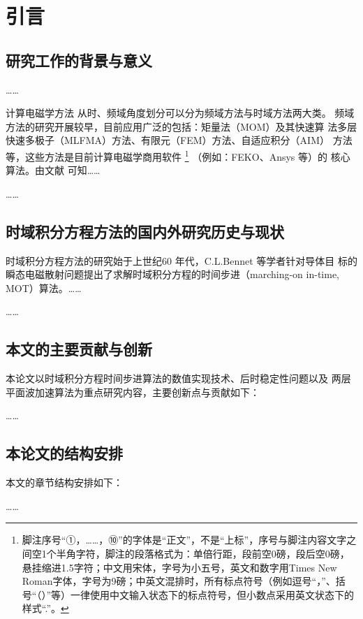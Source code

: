 
\chapter{引言}
\section{研究工作的背景与意义}
……

计算电磁学方法
从时、频域角度划分可以分为频域方法与时域方法两大类。
频域方法的研究开展较早，目前应用广泛的包括：矩量法（MOM）及其快速算
法多层快速多极子（MLFMA）方法、有限元（FEM）方法、自适应积分（AIM）
方法等，这些方法是目前计算电磁学商用软件
\footnote{脚注序号“①，……，⑩”的字体是“正文”，不是“上标”，序号与脚注内容文字之间空1个半角字符，脚注的段落格式为：单倍行距，段前空0磅，段后空0磅，悬挂缩进1.5字符；中文用宋体，字号为小五号，英文和数字用Times New Roman字体，字号为9磅；中英文混排时，所有标点符号（例如逗号“，”、括号“（）”等）一律使用中文输入状态下的标点符号，但小数点采用英文状态下的样式“.”。}
（例如：FEKO、Ansys 等）的
核心算法。由文献\cite{martin1973introduction,clerc2000discrete,walker1995parallel} 可知……

……
\section{时域积分方程方法的国内外研究历史与现状}
时域积分方程方法的研究始于上世纪60 年代，C.L.Bennet 等学者针对导体目
标的瞬态电磁散射问题提出了求解时域积分方程的时间步进（marching-on in-time,
MOT）算法。……

……
\section{本文的主要贡献与创新}
本论文以时域积分方程时间步进算法的数值实现技术、后时稳定性问题以及
两层平面波加速算法为重点研究内容，主要创新点与贡献如下：

……
\section{本论文的结构安排}
本文的章节结构安排如下：

……
